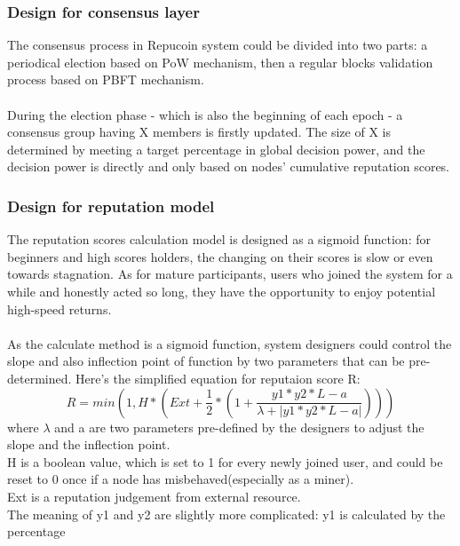 \documentclass[doublespacing]{bmcart}
\begin{document}
\begin{CJK*}{UTF8}{gbsn}
	\subsubsection*{Design for consensus layer}
	The consensus process in Repucoin system could be divided into two parts: a periodical election based on PoW mechanism, then a regular blocks validation process based on PBFT mechanism.
	\paragraph{}
	During the election phase - which is also the beginning of each epoch - a consensus group having X members is firstly updated. The size of X is determined by meeting a target percentage in global decision power, and the decision power is directly and only based on nodes' cumulative reputation scores.
	\subsubsection*{Design for reputation model}
	The reputation scores calculation model is designed as a sigmoid function: for beginners and high scores holders, the changing on their scores is slow or even towards stagnation. As for mature participants, users who joined the system for a while and honestly acted so long, they have the opportunity to enjoy potential high-speed returns.
	\paragraph{}
	As the calculate method is a sigmoid function, system designers could control the slope and also inflection point of function by two parameters that can be pre-determined. Here's the simplified equation for reputaion score R:
	\begin{equation}
	R = min(1, H * (Ext + \frac{1}{2}*(1+\frac{y1*y2*L-a}{\lambda+|y1*y2*L-a|}) ))
	\end{equation}
where $\lambda$ and a are two parameters pre-defined by the designers to adjust the slope and the inflection point.	
\\H is a boolean value, which is set to 1 for every newly joined user, and could be reset to 0 once if a node has misbehaved(especially as a miner).
\\Ext is a reputation judgement from external resource. 
\\The meaning of y1 and y2 are slightly more complicated: y1 is calculated by the percentage 
	
	\paragraph{}

\end{CJK*}
\end{document}
